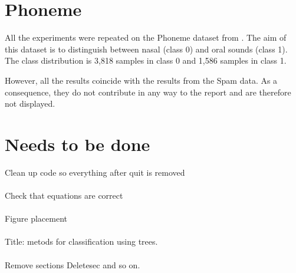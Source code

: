 \section{Phoneme}
\label{sec:Phoneme}
All the experiments were repeated on the Phoneme dataset from \cite{phoneme}. 
The aim of this dataset is to distinguish between nasal (class 0) and oral sounds (class 1). The class distribution is 3,818 samples in class 0 and 1,586 samples in class 1. 

However, all the results coincide with the results from the Spam data. As a consequence, they do not contribute in any way to the report and are therefore not displayed. 


\clearpage
\section{Needs to be done}
\label{sec:Needs to be done}
Clean up code so everything after quit is removed\\
\\
Check that equations are correct\\
\\
Figure placement\\
\\
Title: metods for classification using trees.\\
\\
Remove sections Deletesec and so on.\\

